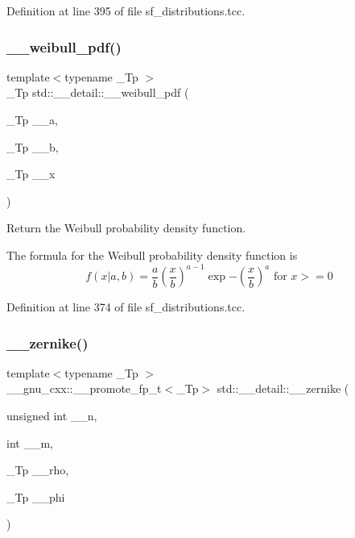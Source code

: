 Definition at line 395 of file sf\+\_\+distributions.\+tcc.

\mbox{\label{namespacestd_1_1____detail_ab15a21521bc750303938a108c5a0bb0b}} 
\subsubsection{\texorpdfstring{\+\_\+\+\_\+weibull\+\_\+pdf()}{\_\_weibull\_pdf()}}
{\footnotesize\ttfamily template$<$typename \+\_\+\+Tp $>$ \\
\+\_\+\+Tp std\+::\+\_\+\+\_\+detail\+::\+\_\+\+\_\+weibull\+\_\+pdf (\begin{DoxyParamCaption}\item[{\+\_\+\+Tp}]{\+\_\+\+\_\+a,  }\item[{\+\_\+\+Tp}]{\+\_\+\+\_\+b,  }\item[{\+\_\+\+Tp}]{\+\_\+\+\_\+x }\end{DoxyParamCaption})}



Return the Weibull probability density function. 

The formula for the Weibull probability density function is \[ f(x | a, b) = \frac{a}{b} \left(\frac{x}{b} \right)^{a-1} \exp{-\left(\frac{x}{b}\right)^a} \mbox{ for } x >= 0 \] 

Definition at line 374 of file sf\+\_\+distributions.\+tcc.

\mbox{\label{namespacestd_1_1____detail_aa09d6c12ea20927f2ea5f7a1ba2f8319}} 
\subsubsection{\texorpdfstring{\+\_\+\+\_\+zernike()}{\_\_zernike()}}
{\footnotesize\ttfamily template$<$typename \+\_\+\+Tp $>$ \\
\+\_\+\+\_\+gnu\+\_\+cxx\+::\+\_\+\+\_\+promote\+\_\+fp\+\_\+t$<$\+\_\+\+Tp$>$ std\+::\+\_\+\+\_\+detail\+::\+\_\+\+\_\+zernike (\begin{DoxyParamCaption}\item[{unsigned int}]{\+\_\+\+\_\+n,  }\item[{int}]{\+\_\+\+\_\+m,  }\item[{\+\_\+\+Tp}]{\+\_\+\+\_\+rho,  }\item[{\+\_\+\+Tp}]{\+\_\+\+\_\+phi }\end{DoxyParamCaption})}

